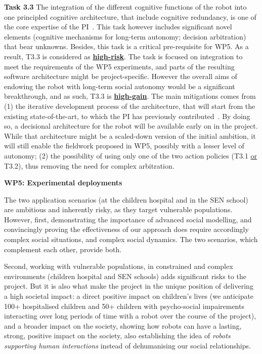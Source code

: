 \textbf{Task 3.3} The integration of the different cognitive functions of the
robot into one principled cognitive architecture, that include cognitive
redundancy, is one of the core expertise of the
PI~\cite{lemaignan2017artificial}. This task however includes significant novel
elements (cognitive mechanisms for long-term autonomy; decision arbitration)
that bear unknowns. Besides, this task is a critical pre-requisite for WP5. As a
result, T3.3 is considered as \ul{\bf high-risk}. The task is focused on
integration to meet the requirements of the WP5 experiments, and parts
of the resulting software architecture might be project-specific. However the
overall aims of endowing the robot with long-term social autonomy would be a
significant breakthrough, and as such, T3.3 is \ul{\bf high-gain}. The main
mitigations comes from (1) the iterative development process of the
architecture, that will start from the existing state-of-the-art, to which the
PI has previously contributed~\cite{lemaignan2017artificial}. By doing so, a
decisional architecture for the robot will be available early on in the project.
While that architecture might be a scaled-down version of the initial ambition,
it will still enable the fieldwork proposed in WP5, possibly with a lesser level
of autonomy; (2) the possibility of using only one of the two action policies
(T3.1 \ul{or} T3.2), thus removing the need for complex arbitration.

\vspace{1em}

\textbf{WP5: Experimental deployments}

The two application scenarios (at the children hospital and in the SEN school)
are ambitious and inherently risky, as they target vulnerable populations.
However, first, demonstrating the importance of advanced social modelling, and
convincingly proving the effectiveness of our approach does require accordingly
complex social situations, and complex social dynamics. The two scenarios, which
complement each other, provide both.

Second, working with vulnerable populations, in constrained and complex
environments (children hospital and SEN schools) adds significant risks to the
project. But it is also what make the project in the unique position of
delivering a high societal impact: a direct positive impact on children's lives
(we anticipate 100+ hospitalised children and 50+ children with psycho-social
impairements interacting over long periods of time with a robot over the course
of the project), and a broader impact on the society, showing how robots can
have a lasting, strong, positive impact on the society, also establishing the
idea of \emph{robots supporting human interactions} instead of dehumanising our
social relationships.

